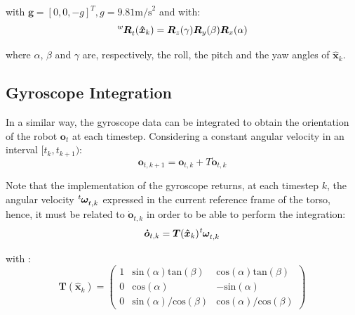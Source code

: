 \documentclass[a4paper]{article}
\begin{document}
\noindent with $\bm{g} = [0, 0, -g]^T, g = 9.81 \text{m/s}^2$ and with:
\begin{equation}
    \tensor[^w]{\bm{R}}{_t}(\bm{\hat{x}}_{k}) = \bm{R}_z(\gamma) \bm{R}_y(\beta) \bm{R}_x(\alpha)
\end{equation}

\noindent where $\alpha$, $\beta$ and $\gamma$ are, respectively,
the roll, the pitch and the yaw angles of $\bm{\hat{x}}_{k}$.

\subsection{Gyroscope Integration}
\label{subsec:gyro-integration}
In a similar way, the gyroscope data can be integrated to obtain the
orientation of the robot $\bm{o}_t$ at each timestep. Considering a constant angular
velocity in an interval $[t_k, t_{k+1})$:
\begin{equation}
    \label{eq:orientation-gyro-integration}
    \bm{o}_{t,k+1} = \bm{o}_{t,k} + T \bm{\dot{o}}_{t,k}
\end{equation}


Note that the implementation of the gyroscope returns, at each
timestep $k$, the angular velocity
$\tensor[^t]{\bm{\omega}}{_{t,k}}$ expressed in the current
reference frame of the torso, hence, it must be related to $\bm{\dot{o}}_{t,k}$
in order to be able to perform the integration:
\begin{equation}
    \bm{\dot{o}}_{t,k} = \bm{T}(\bm{\hat{x}}_{k}) \tensor[^t]{\bm{\omega}}{_{t,k}}
\end{equation}

\noindent with \cite{DBLP:conf/smc/LeeBDSXT09}:
\begin{equation}
    \bm{T}(\bm{\hat{x}}_{k}) =
    \begin{pmatrix}
        1 & \text{sin}(\alpha) \text{tan}(\beta) & \text{cos}(\alpha) \text{tan}(\beta) \\
		0 & \text{cos}(\alpha) & -\text{sin}(\alpha) \\
		0 & \text{sin}(\alpha)/\text{cos}(\beta) & \text{cos}(\alpha)/\text{cos}(\beta)
    \end{pmatrix}
\end{equation}
\end{document}

